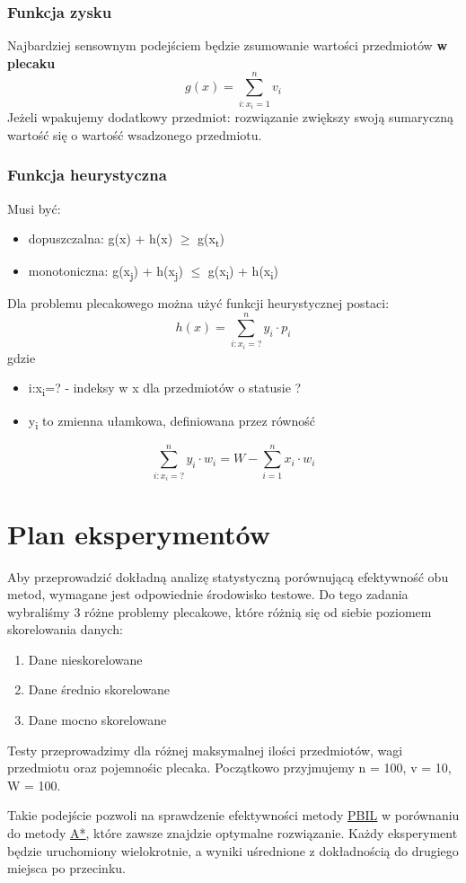 \documentclass[11pt]{article}
\begin{document}
\subsubsection{Funkcja zysku}
\label{sec:orgf97f734}
Najbardziej sensownym podejściem będzie zsumowanie wartości przedmiotów \textbf{w plecaku}
\[
        g(x) = \sum_{i:x_i=1}^n{v_i}
\]
Jeżeli wpakujemy dodatkowy przedmiot: rozwiązanie zwiększy swoją sumaryczną wartość się o wartość wsadzonego przedmiotu.
\subsubsection{Funkcja heurystyczna}
\label{sec:org8963b0e}
Musi być:
\begin{itemize}
\item dopuszczalna: g(x) + h(x) \(\ge\) g(x\textsubscript{t})
\item monotoniczna: g(x\textsubscript{j}) + h(x\textsubscript{j}) \(\le\) g(x\textsubscript{i}) + h(x\textsubscript{i})
\end{itemize}
Dla problemu plecakowego można użyć funkcji heurystycznej postaci:
\[
        h(x) = \sum_{i:x_i=?}^n{y_i \cdot p_i}
\]
gdzie
\begin{itemize}
\item i:x\textsubscript{i}=? - indeksy w x dla przedmiotów o statusie ?
\item y\textsubscript{i} to zmienna ułamkowa, definiowana przez równość
\end{itemize}
\[
        \sum_{i:x_i=?}^n{y_i \cdot w_i} = W - \sum_{i=1}^n{x_i \cdot w_i}
\]
\section{Plan eksperymentów}
\label{sec:org78ee836}
Aby przeprowadzić dokładną analizę statystyczną porównującą efektywność obu metod, wymagane jest odpowiednie środowisko testowe. Do tego zadania wybraliśmy 3 różne problemy plecakowe, które różnią się od siebie poziomem skorelowania danych:
\begin{enumerate}
\item Dane nieskorelowane
\item Dane średnio skorelowane
\item Dane mocno skorelowane
\end{enumerate}
Testy przeprowadzimy dla różnej maksymalnej ilości przedmiotów, wagi przedmiotu oraz pojemnośic plecaka. Początkowo przyjmujemy n = 100, v = 10, W = 100.

Takie podejście pozwoli na sprawdzenie efektywności metody \uline{\hyperref[sec:org5c31017]{PBIL}} w porównaniu do metody \hyperref[sec:orgd1b064a]{\uline{A*}}, które zawsze znajdzie optymalne rozwiązanie. Każdy eksperyment będzie uruchomiony wielokrotnie, a wyniki uśrednione z dokładnością do drugiego miejsca po przecinku.
\end{document}
